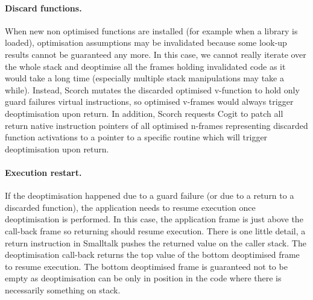 \documentclass[a4paper,12pt,twoside]{../includes/ThesisStyle}
\begin{document}
\paragraph{Discard functions.} When new non optimised functions are installed (for example when a library is loaded), optimisation assumptions may be invalidated because some look-up results cannot be guaranteed any more. In this case, we cannot really iterate over the whole stack and deoptimise all the frames holding invalidated code as it would take a long time (especially multiple stack manipulations may take a while). Instead, Scorch mutates the discarded optimised v-function to hold only guard failures virtual instructions, so optimised v-frames would always trigger deoptimisation upon return. In addition, Scorch requests Cogit to patch all return native instruction pointers of all optimised n-frames representing discarded function activations to a pointer to a specific routine which will trigger deoptimisation upon return.

\paragraph{Execution restart.}

If the deoptimisation happened due to a guard failure (or due to a return to a discarded function), the application needs to resume execution once deoptimisation is performed. In this case, the application frame is just above the call-back frame so returning should resume execution. There is one little detail, a return instruction in Smalltalk pushes the returned value on the caller stack. The deoptimisation call-back returns the top value of the bottom deoptimised frame to resume execution. The bottom deoptimised frame is guaranteed not to be empty as deoptimisation can be only in position in the code where there is necessarily something on stack.


\end{document}
